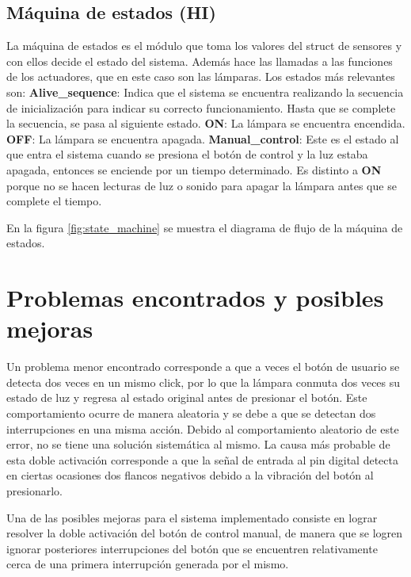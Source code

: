 \subsection{Máquina de estados (HI)}

La máquina de estados es el módulo que toma los valores del struct de sensores y con ellos decide el
estado del sistema. Además hace las llamadas a las funciones de los actuadores, que en este caso son
las lámparas. 
Los estados más relevantes son:
 \textbf{Alive\_sequence}: Indica que el sistema se encuentra realizando la secuencia de
  inicialización para indicar su correcto funcionamiento. Hasta que se complete la secuencia, se
  pasa al siguiente estado. 
 \textbf{ON}: La lámpara se encuentra encendida.
 \textbf{OFF}: La lámpara se encuentra apagada.
 \textbf{Manual\_control}: Este es el estado al que entra el sistema cuando se presiona el
  botón de control y la luz estaba apagada, entonces se enciende por un tiempo determinado. Es
  distinto a \textbf{ON} porque no se hacen lecturas de luz o sonido para apagar la lámpara antes
  que se complete el tiempo.

En la figura \ref{fig:state_machine} se muestra el diagrama de flujo de la máquina de estados. 

\section{Problemas encontrados y posibles mejoras}

Un problema menor encontrado corresponde a que a veces el botón de usuario se detecta
dos veces en un mismo click, por lo que la lámpara conmuta dos veces su estado de luz y regresa al
estado original antes de presionar el botón. Este comportamiento ocurre de manera aleatoria y se
debe a que se detectan dos interrupciones en una misma acción. Debido al comportamiento aleatorio de
este error, no se tiene una solución sistemática al mismo. La causa más probable de esta doble
activación corresponde a que la señal de entrada al pin digital detecta en ciertas ocasiones dos
flancos negativos debido a la vibración del botón al presionarlo.

Una de las posibles mejoras para el sistema implementado consiste en lograr resolver la doble
activación del botón de control manual, de manera que se logren ignorar posteriores interrupciones
del botón que se encuentren relativamente cerca de una primera interrupción generada por el mismo.


